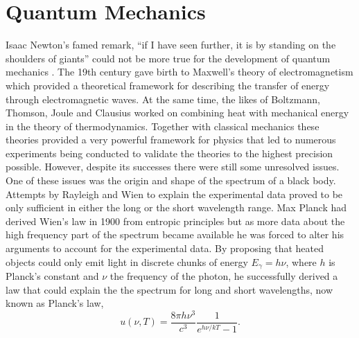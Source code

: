 \chapter{Quantum Mechanics}\label{sec:qm}

Isaac Newton's famed remark, ``if I have seen further, it is by standing on the shoulders of giants'' could not be more true for the development of quantum mechanics \cite{Newton1675}. The 19th century gave birth to Maxwell's theory of electromagnetism which provided a theoretical framework for describing the transfer of energy through electromagnetic waves. At the same time, the likes of Boltzmann, Thomson, Joule and Clausius worked on combining heat with mechanical energy in the theory of thermodynamics. Together with classical mechanics these theories provided a very powerful framework for physics that led to numerous experiments being conducted to validate the theories to the highest precision possible. However, despite its successes there were still some unresolved issues. One of these issues was the origin and shape of the spectrum of a black body. Attempts by Rayleigh and Wien to explain the experimental data proved to be only sufficient in either the long or the short wavelength range. Max Planck had derived Wien's law in 1900 from entropic principles but as more data about the high frequency part of the spectrum became available he was forced to alter his arguments to account for the experimental data. By proposing that heated objects could only emit light in discrete chunks of energy $E_{\gamma} = h \nu$, where $h$ is Planck's constant and $\nu$ the frequency of the photon, he successfully derived a law that could explain the the spectrum for long and short wavelengths, now known as Planck's law,
\begin{equation*}
    u(\nu,T) = \frac{8 \pi h \nu^3}{c^3}\frac{1}{e^{h\nu / kT} - 1}.
\end{equation*}
